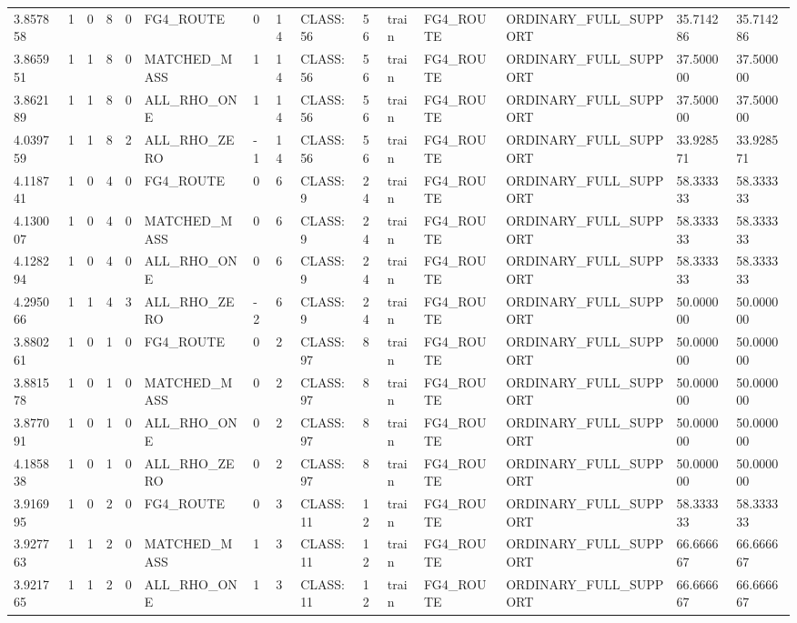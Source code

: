 \begin{tabular}{lllllllllllllll}
3.857858 & 1 & 0 & 8 & 0 & FG4\_ROUTE & 0 & 14 & CLASS:56 & 56 & train & FG4\_ROUTE & ORDINARY\_FULL\_SUPPORT & 35.714286 & 35.714286 \\
3.865951 & 1 & 1 & 8 & 0 & MATCHED\_MASS & 1 & 14 & CLASS:56 & 56 & train & FG4\_ROUTE & ORDINARY\_FULL\_SUPPORT & 37.500000 & 37.500000 \\
3.862189 & 1 & 1 & 8 & 0 & ALL\_RHO\_ONE & 1 & 14 & CLASS:56 & 56 & train & FG4\_ROUTE & ORDINARY\_FULL\_SUPPORT & 37.500000 & 37.500000 \\
4.039759 & 1 & 1 & 8 & 2 & ALL\_RHO\_ZERO & -1 & 14 & CLASS:56 & 56 & train & FG4\_ROUTE & ORDINARY\_FULL\_SUPPORT & 33.928571 & 33.928571 \\
4.118741 & 1 & 0 & 4 & 0 & FG4\_ROUTE & 0 & 6 & CLASS:9 & 24 & train & FG4\_ROUTE & ORDINARY\_FULL\_SUPPORT & 58.333333 & 58.333333 \\
4.130007 & 1 & 0 & 4 & 0 & MATCHED\_MASS & 0 & 6 & CLASS:9 & 24 & train & FG4\_ROUTE & ORDINARY\_FULL\_SUPPORT & 58.333333 & 58.333333 \\
4.128294 & 1 & 0 & 4 & 0 & ALL\_RHO\_ONE & 0 & 6 & CLASS:9 & 24 & train & FG4\_ROUTE & ORDINARY\_FULL\_SUPPORT & 58.333333 & 58.333333 \\
4.295066 & 1 & 1 & 4 & 3 & ALL\_RHO\_ZERO & -2 & 6 & CLASS:9 & 24 & train & FG4\_ROUTE & ORDINARY\_FULL\_SUPPORT & 50.000000 & 50.000000 \\
3.880261 & 1 & 0 & 1 & 0 & FG4\_ROUTE & 0 & 2 & CLASS:97 & 8 & train & FG4\_ROUTE & ORDINARY\_FULL\_SUPPORT & 50.000000 & 50.000000 \\
3.881578 & 1 & 0 & 1 & 0 & MATCHED\_MASS & 0 & 2 & CLASS:97 & 8 & train & FG4\_ROUTE & ORDINARY\_FULL\_SUPPORT & 50.000000 & 50.000000 \\
3.877091 & 1 & 0 & 1 & 0 & ALL\_RHO\_ONE & 0 & 2 & CLASS:97 & 8 & train & FG4\_ROUTE & ORDINARY\_FULL\_SUPPORT & 50.000000 & 50.000000 \\
4.185838 & 1 & 0 & 1 & 0 & ALL\_RHO\_ZERO & 0 & 2 & CLASS:97 & 8 & train & FG4\_ROUTE & ORDINARY\_FULL\_SUPPORT & 50.000000 & 50.000000 \\
3.916995 & 1 & 0 & 2 & 0 & FG4\_ROUTE & 0 & 3 & CLASS:11 & 12 & train & FG4\_ROUTE & ORDINARY\_FULL\_SUPPORT & 58.333333 & 58.333333 \\
3.927763 & 1 & 1 & 2 & 0 & MATCHED\_MASS & 1 & 3 & CLASS:11 & 12 & train & FG4\_ROUTE & ORDINARY\_FULL\_SUPPORT & 66.666667 & 66.666667 \\
3.921765 & 1 & 1 & 2 & 0 & ALL\_RHO\_ONE & 1 & 3 & CLASS:11 & 12 & train & FG4\_ROUTE & ORDINARY\_FULL\_SUPPORT & 66.666667 & 66.666667 \\

\end{tabular}
